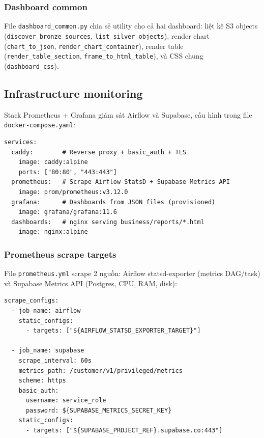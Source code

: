 \subsubsection{Dashboard common}

File \texttt{dashboard\_common.py}
chia sẻ utility cho cả hai dashboard: liệt kê S3 objects
(\texttt{discover\_bronze\_sources}, \texttt{list\_silver\_objects}), render
chart (\texttt{chart\_to\_json}, \texttt{render\_chart\_container}), render
table (\texttt{render\_table\_section}, \texttt{frame\_to\_html\_table}), và
CSS chung (\texttt{dashboard\_css}).

\subsection{Infrastructure monitoring}
\label{subsec:infra-monitoring}

Stack Prometheus + Grafana giám sát Airflow và Supabase, cấu hình trong
file \texttt{docker-compose.yaml}:

\begin{lstlisting}[style=yamlstyle, caption={Monitoring stack — 4 services}]
services:
  caddy:        # Reverse proxy + basic_auth + TLS
    image: caddy:alpine
    ports: ["80:80", "443:443"]
  prometheus:   # Scrape Airflow StatsD + Supabase Metrics API
    image: prom/prometheus:v3.12.0
  grafana:      # Dashboards from JSON files (provisioned)
    image: grafana/grafana:11.6
  dashboards:   # nginx serving business/reports/*.html
    image: nginx:alpine
\end{lstlisting}

\subsubsection{Prometheus scrape targets}

File \texttt{prometheus.yml}
scrape 2 nguồn: Airflow statsd-exporter (metrics DAG/task) và Supabase Metrics
API (Postgres, CPU, RAM, disk):

\begin{lstlisting}[style=yamlstyle, caption={Prometheus — scrape Airflow + Supabase}]
scrape_configs:
  - job_name: airflow
    static_configs:
      - targets: ["${AIRFLOW_STATSD_EXPORTER_TARGET}"]

  - job_name: supabase
    scrape_interval: 60s
    metrics_path: /customer/v1/privileged/metrics
    scheme: https
    basic_auth:
      username: service_role
      password: ${SUPABASE_METRICS_SECRET_KEY}
    static_configs:
      - targets: ["${SUPABASE_PROJECT_REF}.supabase.co:443"]
\end{lstlisting}


